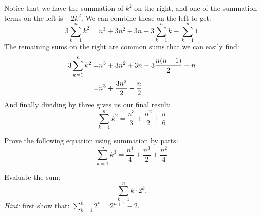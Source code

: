 Notice that we have the summation of $k^2$ on the right, and one of the summation terms on the left is $-2k^2$.  We can combine these on the left to get:
\[ 3 \sum_{k=1}^n k^2 =n^3 + 3n^2 + 3n - 3\sum_{k=1}^n k - \sum_{k=1}^n 1 \]
The remaining sums on the right are common sums that we can easily find:
\begin{align}
3 \sum_{k=1}^n k^2 =& n^3 + 3n^2 + 3n - 3\frac{n(n+1)}{2} - n \notag\\
=& n^3 + \frac{3n^2}{2} + \frac{n}{2} \notag
\end{align}
And finally dividing by three gives us our final result:
\[ \sum_{k=1}^n k^2 = \frac{n^3}{3} + \frac{n^2}{2} + \frac{n}{6} \]

\begin{exercise}{}
Prove the following equation using summation by parts:
\[ \sum_{k=1}^n k^3 = \frac{n^4}{4} + \frac{n^3}{2} + \frac{n^2}{4} \]
\end{exercise}

\begin{exercise}{} Evaluate the sum: 
\[\sum_{k=1}^n k \cdot 2^k.\]
\emph{Hint:} first show that:  $\sum_{k=1}^n 2^k = 2^{n+1} - 2$.

\end{exercise}



